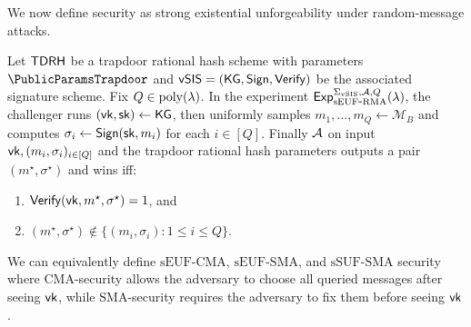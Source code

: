 We now define security as strong existential unforgeability under random-message attacks.
\begin{definition}\label{def:vsis-games}
Let \(\mathsf{TDRH}\) be a trapdoor rational hash scheme with parameters
\(\PublicParamsTrapdoor\) and
\(\mathsf{vSIS}=(\mathsf{KG},\mathsf{Sign},\mathsf{Verify})\) be the associated signature scheme.
Fix \(Q\in\mathrm{poly}(\lambda)\). In the experiment
\(\mathsf{Exp}_{\mathrm{sEUF\mbox{-}RMA}}^{\Sigma_{\mathrm{vSIS}},\mathcal{A},Q}(\lambda)\), the challenger runs
\((\mathsf{vk},\mathsf{sk})\gets \mathsf{KG}\), then uniformly samples \(m_1,\ldots,m_Q \gets \mathcal{M}_B\) and computes
\(\sigma_i\leftarrow \mathsf{Sign}(\mathsf{sk},m_i)\) for each \(i\in [Q]\). Finally
\(\mathcal{A}\) on input $\mathsf{vk},(m_i,\sigma_i)_{i\in [Q]}$ and the trapdoor rational hash parameters outputs a pair \((m^\star,\sigma^\star)\) and wins iff:
\begin{enumerate}[leftmargin=1.25em]
    \item \(\mathsf{Verify}(\mathsf{vk},m^\star,\sigma^\star)=1\), and
    \item \((m^\star,\sigma^\star)\notin \{(m_i,\sigma_i):1\le i\le Q\}\).
\end{enumerate}
\end{definition}
We can equivalently define \(\mathrm{sEUF\mbox{-}CMA}\), \(\mathrm{sEUF\mbox{-}SMA}\), and
\(\mathrm{sSUF\mbox{-}SMA}\) security where \(\mathrm{CMA}\)-security allows the adversary to choose all queried
messages after seeing \(\mathsf{vk}\), while \(\mathrm{SMA}\)-security requires the adversary to fix them before seeing
\(\mathsf{vk}\).

